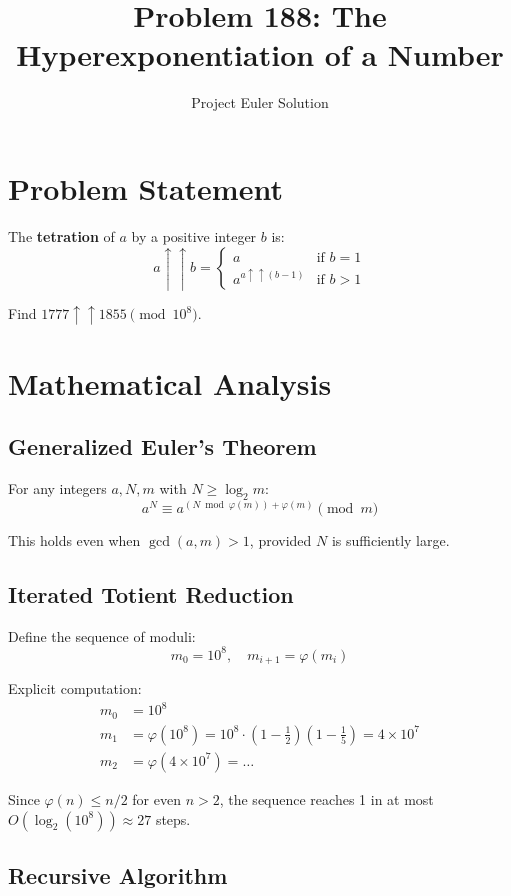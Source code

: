 \documentclass[12pt]{article}
\title{Problem 188: The Hyperexponentiation of a Number}
\author{Project Euler Solution}
\date{}
\begin{document}
\maketitle

\section{Problem Statement}

The \textbf{tetration} of $a$ by a positive integer $b$ is:
\[
a \uparrow\uparrow b = \begin{cases} a & \text{if } b = 1 \\ a^{a \uparrow\uparrow (b-1)} & \text{if } b > 1 \end{cases}
\]

Find $1777 \uparrow\uparrow 1855 \pmod{10^8}$.

\section{Mathematical Analysis}

\subsection{Generalized Euler's Theorem}

For any integers $a, N, m$ with $N \ge \log_2 m$:
\[
a^N \equiv a^{(N \bmod \varphi(m)) + \varphi(m)} \pmod{m}
\]

This holds even when $\gcd(a, m) > 1$, provided $N$ is sufficiently large.

\subsection{Iterated Totient Reduction}

Define the sequence of moduli:
\[
m_0 = 10^8, \quad m_{i+1} = \varphi(m_i)
\]

Explicit computation:
\begin{align}
m_0 &= 10^8 \\
m_1 &= \varphi(10^8) = 10^8 \cdot (1 - \tfrac{1}{2})(1 - \tfrac{1}{5}) = 4 \times 10^7 \\
m_2 &= \varphi(4 \times 10^7) = \ldots
\end{align}

Since $\varphi(n) \le n/2$ for even $n > 2$, the sequence reaches 1 in at most $O(\log_2(10^8)) \approx 27$ steps.

\subsection{Recursive Algorithm}
\end{document}
